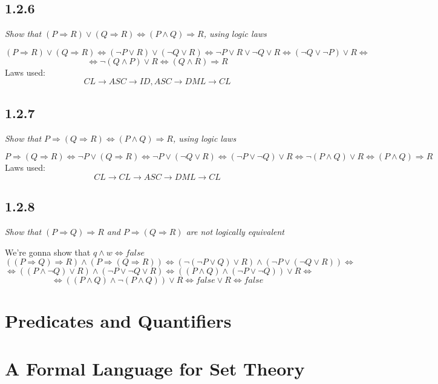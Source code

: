 \documentclass[11pt,oneside,titlepage]{book}
\DeclareMathOperator \eqv {\Leftrightarrow}
\DeclareMathOperator \imp {\Rightarrow}
\begin{document}
\subsection*{1.2.6}

\textit{Show that $(P \imp R) \lor (Q \imp R) \eqv (P \land Q) \imp R$, using logic laws}

$$(P \imp R) \lor (Q \imp R)  \eqv (\neg P \lor R) \lor (\neg Q \lor R) \eqv
\neg P \lor R \lor \neg Q \lor R \eqv (\neg Q \lor \neg P) \lor R \eqv$$
$$ \eqv \neg (Q \land P) \lor R
\eqv (Q \land R) \imp R$$
Laws used:
$$CL \to ASC \to ID, ASC \to DML \to CL$$

\subsection*{1.2.7}

\textit{Show that $P \imp (Q \imp R) \eqv (P \land Q) \imp R$, using logic laws}

$$P \imp (Q \imp R) \eqv \neg P \lor (Q \imp R) \eqv \neg P \lor (\neg Q \lor R) \eqv
(\neg P \lor \neg Q) \lor R \eqv \neg (P \land Q) \lor R \eqv (P \land Q) \imp R$$
Laws used:
$$CL \to CL \to ASC \to DML \to CL$$

\subsection*{1.2.8}

\textit{Show that $(P \imp Q) \imp R$ and $P \imp (Q \imp R)$ are not logically equivalent}

We're gonna show that $q \land w \eqv false$
$$((P \imp Q) \imp R) \land (P \imp (Q \imp R)) \eqv (\neg (\neg P \lor Q) \lor R) \land
(\neg P \lor (\neg Q \lor R)) \eqv $$
$$\eqv ((P \land \neg Q) \lor R) \land (\neg P \lor \neg Q \lor R) \eqv
((P \land Q) \land (\neg P \lor \neg Q)) \lor R  \eqv$$
$$ \eqv ((P \land Q) \land \neg ( P \land  Q)) \lor R  \eqv false \lor R \eqv false$$


\section{Predicates and Quantifiers}

\section{A Formal Language for Set Theory}

\subsection{}
\end{document}
